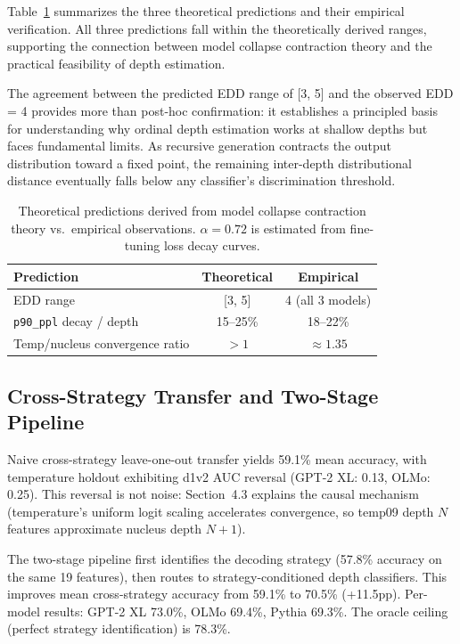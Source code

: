 \documentclass[11pt,a4paper]{article}
\newcommand{\edd}{\textsc{EDD}}
\begin{document}
Table~\ref{tab:theory} summarizes the three theoretical predictions and their empirical verification. All three predictions fall within the theoretically derived ranges, supporting the connection between model collapse contraction theory and the practical feasibility of depth estimation.

The agreement between the predicted \edd{} range of [3, 5] and the observed \edd{} = 4 provides more than post-hoc confirmation: it establishes a principled basis for understanding why ordinal depth estimation works at shallow depths but faces fundamental limits. As recursive generation contracts the output distribution toward a fixed point, the remaining inter-depth distributional distance eventually falls below any classifier's discrimination threshold.

\begin{table}[t]
\centering
\caption{Theoretical predictions derived from model collapse contraction theory vs.\ empirical observations. $\alpha = 0.72$ is estimated from fine-tuning loss decay curves.}
\label{tab:theory}
\small
\begin{tabular}{p{4.5cm}cc}
\toprule
\textbf{Prediction} & \textbf{Theoretical} & \textbf{Empirical} \\
\midrule
\edd{} range & [3, 5] & 4 (all 3 models) \\
\texttt{p90\_ppl} decay / depth & 15--25\% & 18--22\% \\
Temp/nucleus convergence ratio & $> 1$ & $\approx 1.35$ \\
\bottomrule
\end{tabular}
\end{table}

\subsection{Cross-Strategy Transfer and Two-Stage Pipeline}

Naive cross-strategy leave-one-out transfer yields 59.1\% mean accuracy, with temperature holdout exhibiting d1v2 AUC reversal (GPT-2 XL: 0.13, OLMo: 0.25). This reversal is not noise: Section~4.3 explains the causal mechanism (temperature's uniform logit scaling accelerates convergence, so temp09 depth $N$ features approximate nucleus depth $N+1$).

The two-stage pipeline first identifies the decoding strategy (57.8\% accuracy on the same 19 features), then routes to strategy-conditioned depth classifiers. This improves mean cross-strategy accuracy from 59.1\% to 70.5\% (+11.5pp). Per-model results: GPT-2 XL 73.0\%, OLMo 69.4\%, Pythia 69.3\%. The oracle ceiling (perfect strategy identification) is 78.3\%.
\end{document}
